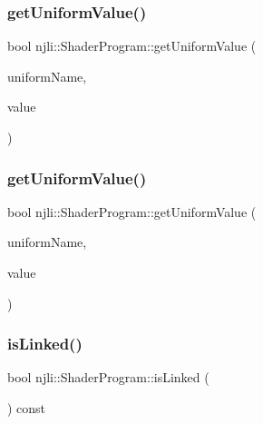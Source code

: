 \subsubsection{\texorpdfstring{get\+Uniform\+Value()}{getUniformValue()}\hspace{0.1cm}{\footnotesize\ttfamily [1/2]}}
{\footnotesize\ttfamily bool njli\+::\+Shader\+Program\+::get\+Uniform\+Value (\begin{DoxyParamCaption}\item[{const char $\ast$}]{uniform\+Name,  }\item[{\mbox{\hyperlink{_util_8h_aa62c75d314a0d1f37f79c4b73b2292e2}{s32}} \&}]{value }\end{DoxyParamCaption})}

\mbox{\label{classnjli_1_1_shader_program_a3a27d20080728fd333fb013f6492ee34}} 
\subsubsection{\texorpdfstring{get\+Uniform\+Value()}{getUniformValue()}\hspace{0.1cm}{\footnotesize\ttfamily [2/2]}}
{\footnotesize\ttfamily bool njli\+::\+Shader\+Program\+::get\+Uniform\+Value (\begin{DoxyParamCaption}\item[{const char $\ast$}]{uniform\+Name,  }\item[{bt\+Transform \&}]{value }\end{DoxyParamCaption})}

\mbox{\label{classnjli_1_1_shader_program_a232cb84b51bfdd0d3ace500fedde45a2}} 
\subsubsection{\texorpdfstring{is\+Linked()}{isLinked()}}
{\footnotesize\ttfamily bool njli\+::\+Shader\+Program\+::is\+Linked (\begin{DoxyParamCaption}{ }\end{DoxyParamCaption}) const}

